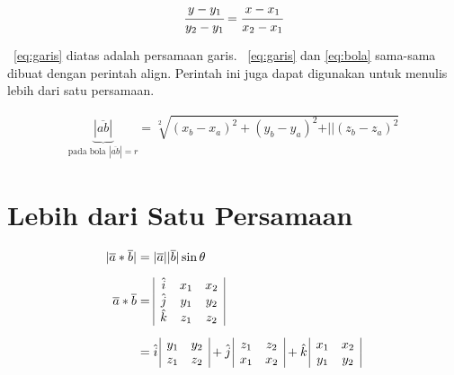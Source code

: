 \noindent \begin{align}\label{eq:garis}
    \cfrac{y - y_{1}}{y_{2} - y_{1}} = 
    \cfrac{x - x_{1}}{x_{2} - x_{1}}
\end{align}

\equ~\ref{eq:garis} diatas adalah persamaan garis. 
\equ~\ref{eq:garis} dan \ref{eq:bola} sama-sama dibuat dengan perintah \bslash
align. 
Perintah ini juga dapat digunakan untuk menulis lebih dari satu persamaan. 

\noindent \begin{align}\label{eq:bola}
    \underbrace{|\overline{ab}|}_{\text{pada bola $|\overline{ab}| = r$}} 
    = \sqrt[2]{(x_{b} - x_{a})^{2} + (y_{b} - y_{a})^{2} + 
        \vert\vert(z_{b} - z_{a})^{2}}
\end{align}

\section{Lebih dari Satu Persamaan}
\label{sec:multiEqu}
\noindent \begin{align}\label{eq:matriks}	
    |\overline{a} * \overline{b}| &= |\overline{a}| |\overline{b}| \sin\theta 
    \\[0.2cm]
    \overline{a} * \overline{b} &=  
    \begin{array}{| c c c |}
        \hat{i} & x_{1} & x_{2} \\
        \hat{j} & y_{1} & y_{2} \\
        \hat{k} & z_{1} & z_{2} \\
    \end{array} \nonumber \\[0.2cm]
    &= \hat{i} \,
    \begin{array}{ | c c | }
        y_{1} & y_{2} \\
        z_{1} & z_{2} \\
    \end{array} 
    + \hat{j} \,
    \begin{array}{ | c c | }
        z_{1} & z_{2} \\
        x_{1} & x_{2} \\
    \end{array} 
    + \hat{k} \,	
    \begin{array}{ | c c | }
        x_{1} & x_{2} \\
        y_{1} & y_{2} \\
    \end{array}
    \nonumber
\end{align}

